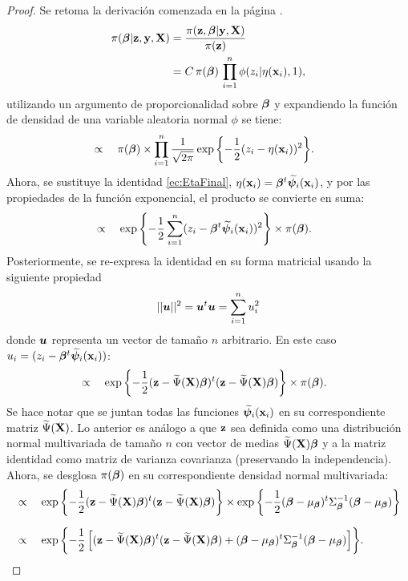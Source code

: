 \documentclass[../../Main/Main.tex]{subfiles}
\begin{document}
\begin{proof}
Se retoma la derivación comenzada en la página \pageref{ec:DefProbaCond}.
\begin{align*}
	\pi(\bm{\beta}|\mathbf{z},\mathbf{y},\mathbf{X})
	& = \dfrac{\pi(\mathbf{z}, \bm{\beta}| \mathbf{y}, \mathbf{X})}{\pi(\mathbf{z})} \\
	& = C \,\pi(\bm{\beta}) \, \prod_{i = 1}^n\phi(z_i|\eta(\mathbf{x}_i),1),
\end{align*}
utilizando un argumento de proporcionalidad sobre $\bm{\beta}$ y expandiendo la función de densidad de una variable aleatoria normal $\phi$ se tiene:
\begin{align*}
	& \propto \quad \pi(\bm{\beta})\times \prod_{i = 1}^n \dfrac{1}{\sqrt{2\pi}}\exp{\left\{ -\dfrac{1}{2}(z_i - \eta(\mathbf{x}_i))^2 \right\}}.
\end{align*}
Ahora, se sustituye la identidad \eqref{ec:EtaFinal}, $\eta(\mathbf{x}_i) = \bm{\beta}^t\widetilde{\bm{\psi}}_i(\mathbf{x}_i)$, y por las propiedades de la función exponencial, el producto se convierte en suma:
\begin{align*}
	& \propto \quad  \exp{\left\{ -\dfrac{1}{2}\sum_{i = 1}^n(z_i - \bm{\beta}^t\widetilde{\bm{\psi}}_i(\mathbf{x}_i))^2 \right\}}\times \pi(\bm{\beta}).
\end{align*}
Posteriormente, se re-expresa la identidad en su forma matricial usando la siguiente propiedad $$||\bm{u}||^2 = \bm{u}^t\bm{u} = \sum_{i = 1}^n u_i^2$$ donde $\bm{u}$ representa un vector de tamaño $n$ arbitrario. En este caso $u_i = (z_i - \bm{\beta}^t\widetilde{\bm{\psi}}_i(\mathbf{x}_i))$:
\begin{align*}
	& \propto \quad  \exp{\left\{ -\dfrac{1}{2}(\mathbf{z}- \widetilde{\Psi}(\mathbf{X})\bm{\beta})^t(\mathbf{z}- \widetilde{\Psi}(\mathbf{X})\bm{\beta}) \right\}}\times \pi(\bm{\beta}).
\end{align*}
Se hace notar que se juntan todas las funciones $\widetilde{\bm{\psi}}_i(\mathbf{x}_i)$ en su correspondiente matriz $\widetilde{\Psi}(\mathbf{X})$. Lo anterior es análogo a que $\mathbf{z}$ sea definida como una distribución normal multivariada de tamaño $n$ con vector de medias $\widetilde{\Psi}(\mathbf{X}) \bm{\beta}$ y a la matriz identidad como matriz de varianza covarianza (preservando la independencia). Ahora, se desglosa $\pi(\bm{\beta})$ en su correspondiente densidad normal multivariada:
\begin{align}
	& \propto \quad \exp{\left\{ -\dfrac{1}{2}(\zsn - \tildePsi \betabf)^t(\zsn - \tildePsi\betabf) \right\}}\times \exp{\left\{ -\dfrac{1}{2}(\betabf - \mubeta)^t\Sigmabeta^{-1}(\betabf - \mubeta) \right\}} \nonumber\\[6pt]
	& \propto \quad \exp{\left\{ -\dfrac{1}{2} \left[ (\zsn - \tildePsi \betabf)^t(\zsn - \tildePsi\betabf) + (\betabf - \mubeta)^t\Sigmabeta^{-1}(\betabf - \mubeta) \right]\right\}} \label{ec:DerivacionNormal1}.

\end{align}
\end{proof}
\end{document}
